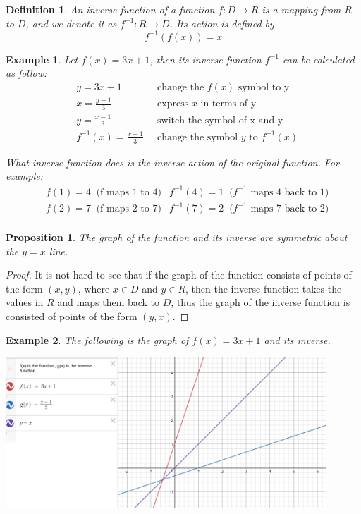 \documentclass{article}
\newtheorem{definition}{Definition}
\newtheorem{ex}{Example}
\newtheorem{prop}{Proposition}
\begin{document}
\begin{definition}
	An inverse function of a function $f:D\to R$ is a mapping from $R$ to $D$, and we denote it as $f^{-1}:R\to D$. Its action is defined by 
	\[ f^{-1}(f(x)) = x \]
\end{definition}
\begin{ex}
	Let $f(x)= 3x+1$, then its inverse function $f^{-1}$ can be calculated as follow:
	\begin{align*}
	&y=3x+1\;\;&\text{change the $f(x)$ symbol to y}\\
	&x = \frac{y-1}{3}\;\;&\text{express $x$ in terms of y}\\
	&y = \frac{x-1}{3}\;\; &\text{switch the symbol of x and y}\\
	&f^{-1}(x) = \frac{x-1}{3}\;\;&\text{change the symbol $y$ to $f^{-1}(x)$} 
	\end{align*}
	
	What inverse function does is the inverse action of the original function. For example: 
	\begin{align*}
	&f(1) = 4\;\;\text{(f maps 1 to 4)} &f^{-1}(4) = 1\;\;\text{($f^{-1}$ maps 4 back to 1)}\\
	&f(2) = 7\;\;\text{(f maps 2 to 7)} &f^{-1}(7) = 2\;\;\text{($f^{-1}$ maps 7 back to 2)}\\
	\end{align*}
\end{ex}
\begin{prop}
	The graph of the function and its inverse are symmetric about the $y=x$ line. 
\end{prop}
\begin{proof}
	It is not hard to see that if the graph of the function consists of points of the form $(x,y)$, where $x\in D$ and $y\in R$, then the inverse function takes the values in $R$ and maps them back to $D$, thus the graph of the inverse function is consisted of points of the form $(y,x)$.
\end{proof}
\begin{ex}
	The following is the graph of $f(x)=3x+1$ and its inverse.
	\begin{center}
		\includegraphics*[width=12cm]{inverse_graph.png}
	\end{center}
\end{ex}
\end{document}
